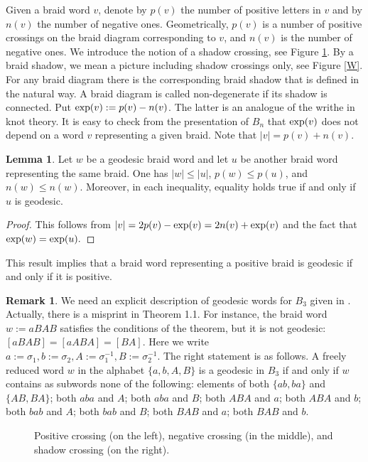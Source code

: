 \documentclass[11pt]{amsart}
\theoremstyle{plain}
\theoremstyle{definition}
\newtheorem{Lemma}[Theorem]{Lemma}
\newtheorem{Remark}[Theorem]{Remark}
\numberwithin{equation}{section}
\begin{document}
Given a braid word $v$, denote by $p(v)$ the number of positive letters in $v$ and by $n(v)$ the number of negative ones. Geometrically, $p(v)$ is a number of positive crossings on the braid diagram corresponding to $v$, and $n(v)$ is the number of negative ones. We introduce the notion of a shadow crossing, see Figure \ref{E2}. By a braid shadow, we mean a picture including shadow crossings only, see Figure \ref{W}. For any braid diagram there is the corresponding braid shadow that is defined in the natural way. A braid diagram is called non-degenerate if its shadow is connected. Put ${\rm exp}(v):= p(v) - n(v)$. The latter is an analogue of the writhe in knot theory. It is easy to check from the presentation of $B_n$ that ${\rm exp}(v)$ does not depend on a word $v$ representing a given braid. Note that $|v| = p(v) + n(v).$

\begin{Lemma}\label{Obviouslemma}
Let $w$ be a geodesic braid word and let $u$ be another braid word representing the same braid. One has $|w| \leq |u|$, $p(w) \leq p(u)$, and $n(w) \leq n(w)$. Moreover, in each inequality, equality holds true if and only if $u$ is geodesic.
\end{Lemma}
\begin{proof}
This follows from $|v| = 2p(v) - {\rm exp}(v) = 2n(v) + {\rm exp}(v)$ and the fact that ${\rm exp}(w) = {\rm exp}(u).$
\end{proof}
This result implies that a braid word representing a positive braid is geodesic if and only if it is positive.

\begin{Remark}\label{B3}
We need an explicit description of geodesic words for $B_3$ given in \cite{Sabalka}. Actually, there is a misprint in Theorem 1.1. For instance, the braid word $w := aBAB$ satisfies the conditions of the theorem, but it is not geodesic: $[aBAB] = [aABA] = [BA].$ Here we write $a := \sigma_1, b:=\sigma_2, A:=\sigma_1^{-1}, B:=\sigma_2^{-1}$. The right statement is as follows. A freely reduced word $w$ in the alphabet $\{a,b,A,B\}$ is a geodesic in $B_3$ if and only if $w$ contains as subwords none of the following: elements of both $\{ab, ba\}$ and $\{AB,BA\}$; both $aba$ and $A$; both $aba$ and $B$; both $ABA$ and $a$; both $ABA$ and $b$; both $bab$ and $A$; both $bab$ and $B$; both $BAB$ and $a$; both $BAB$ and $b$. 
\end{Remark}

\begin{figure}[H]
\centering
{} \hspace{1cm}
 \hspace{1cm}
\caption{Positive crossing (on the left), negative crossing (in the middle), and shadow crossing (on the right).}\label{E2}
\end{figure}
\end{document}
